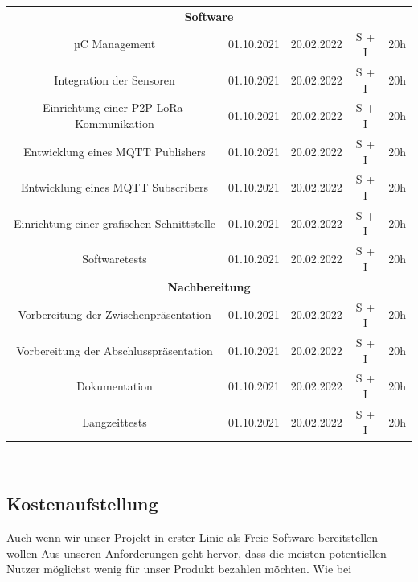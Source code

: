 \begin{adjustwidth}{-1in}{-1in}
\begin{center}
\begin{tabular}{ ccccc }
			\midrule
			\multicolumn{5}{c}{\textbf{Software}} \\
			{µC Management} & {01.10.2021} & {20.02.2022} & S + I & 20h\\
			{Integration der Sensoren} & {01.10.2021} & {20.02.2022} & S + I & 20h\\
			{Einrichtung einer P2P LoRa-Kommunikation} & {01.10.2021} & {20.02.2022} & S + I & 20h\\
			{Entwicklung eines MQTT Publishers} & {01.10.2021} & {20.02.2022} & S + I & 20h\\
			{Entwicklung eines MQTT Subscribers} & {01.10.2021} & {20.02.2022} & S + I & 20h\\
			{Einrichtung einer grafischen Schnittstelle} & {01.10.2021} & {20.02.2022} & S + I & 20h\\
			{Softwaretests} & {01.10.2021} & {20.02.2022} & S + I & 20h\\

			\midrule
			\multicolumn{5}{c}{\textbf{Nachbereitung}} \\
			{Vorbereitung der Zwischenpräsentation} & {01.10.2021} & {20.02.2022} & S + I & 20h\\
			{Vorbereitung der Abschlusspräsentation} & {01.10.2021} & {20.02.2022} & S + I & 20h\\
			{Dokumentation} & {01.10.2021} & {20.02.2022} & S + I & 20h\\
			{Langzeittests} & {01.10.2021} & {20.02.2022} & S + I & 20h\\

			\bottomrule
		\end{tabular}
		 \label{tab:worklog} 
	\end{center}

\end{adjustwidth}

\newpage
\\
\subsection{Kostenaufstellung} \label{Kostenaufstellung}

Auch wenn wir unser Projekt in erster Linie als Freie Software bereitstellen wollen
Aus unseren Anforderungen geht hervor, dass die meisten potentiellen Nutzer möglichst wenig für unser Produkt bezahlen möchten. Wie bei 

